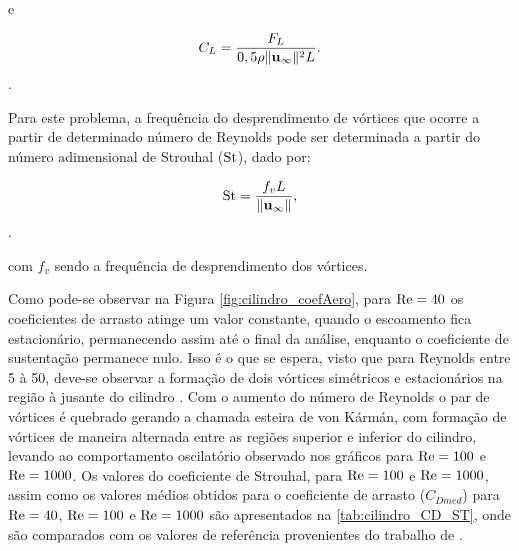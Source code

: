 \noindent e

\begin{align}
	C_L = \frac{F_L}{0,5\rho \lVert \mathbf{u}_{\infty} \lVert^{2} L}.
\end{align}.

Para este problema, a frequência do desprendimento de vórtices que ocorre a partir de determinado número de Reynolds pode ser determinada a partir do número adimensional de Strouhal ($\mathrm{St}$), dado por:

\begin{align}
	\mathrm{St} = \frac{f_{v}L}{\lVert \mathbf{u}_{\infty} \lVert},
\end{align}.

\noindent com $f_{v}$ sendo a frequência de desprendimento dos vórtices.


Como pode-se observar na Figura \ref{fig:cilindro_coefAero}, para $\mathrm{Re} = 40$ os coeficientes de arrasto atinge um valor constante, quando o escoamento fica estacionário, permanecendo assim até o final da análise, enquanto o coeficiente de sustentação permanece nulo. Isso é o que se espera, visto que para Reynolds entre 5 à 50, deve-se observar a formação de dois vórtices simétricos e estacionários na região à jusante do cilindro \cite{Lienhard:1966}. Com o aumento do número de Reynolds o par de vórtices é quebrado gerando a chamada esteira de von Kármán, com formação de vórtices de maneira alternada entre as regiões superior e inferior do cilindro, levando ao comportamento oscilatório observado nos gráficos para $\mathrm{Re} = 100$ e $\mathrm{Re}=1000$. Os valores do coeficiente de Strouhal, para $\mathrm{Re} = 100$ e $\mathrm{Re}=1000$, assim como os valores médios obtidos para o coeficiente de arrasto ($C_{Dmed}$) para $\mathrm{Re} = 40$, $\mathrm{Re} = 100$ e $\mathrm{Re} = 1000$ são apresentados na \autoref{tab:cilindro_CD_ST}, onde são comparados com os valores de referência provenientes do trabalho de .

